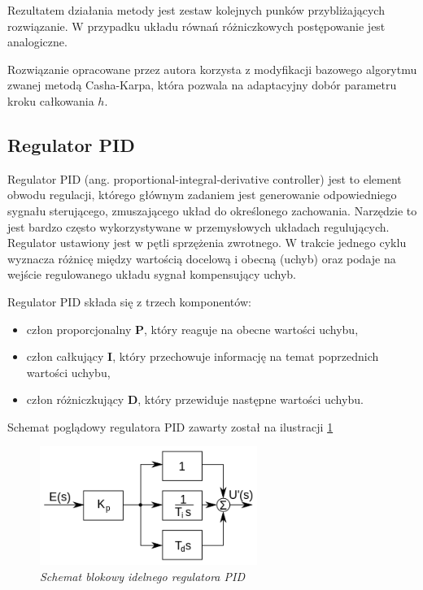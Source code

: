 \documentclass[12pt, oneside]{report}
\theoremstyle{definition}
\begin{document}
Rezultatem działania metody jest zestaw kolejnych punków przybliżających rozwiązanie. W przypadku układu równań różniczkowych postępowanie jest analogiczne. 

Rozwiązanie opracowane przez autora korzysta z modyfikacji bazowego algorytmu zwanej metodą Casha-Karpa, która pozwala na adaptacyjny dobór parametru kroku całkowania \(h\).

\subsection{Regulator PID}
Regulator PID (ang. proportional-integral-derivative controller) jest to element obwodu regulacji, którego głównym zadaniem jest generowanie odpowiedniego sygnału sterującego, zmuszającego układ do określonego zachowania. Narzędzie to jest bardzo często wykorzystywane w przemysłowych układach regulujących. Regulator ustawiony jest w pętli sprzężenia zwrotnego. W trakcie jednego cyklu wyznacza różnicę między wartością docelową i obecną (uchyb) oraz podaje na wejście regulowanego układu sygnał kompensujący uchyb.


 Regulator PID składa się z trzech komponentów:
\begin{itemize}
\item człon proporcjonalny \textbf{P}, który reaguje na obecne wartości uchybu,
\item człon całkujący \textbf{I}, który przechowuje informację na temat poprzednich wartości uchybu,
\item człon różniczkujący \textbf{D}, który przewiduje następne wartości uchybu.
\end{itemize}

Schemat poglądowy regulatora PID zawarty został na ilustracji \ref{PID}

\begin{figure}[H]
	\centering
		\includegraphics[width = 200pt]{PID} 
		\caption{\textit{Schemat blokowy idelnego regulatora PID \cite{PID}}}
		\label{PID}
\end{figure}
\end{document}
